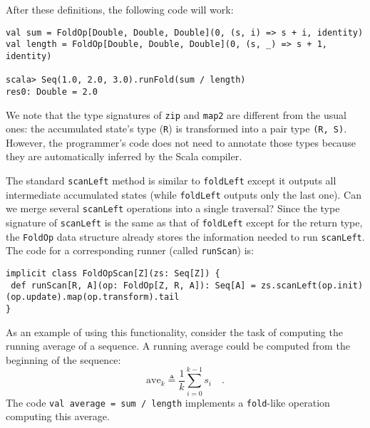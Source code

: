 After these definitions, the following code will work:
\begin{lstlisting}
val sum = FoldOp[Double, Double, Double](0, (s, i) => s + i, identity)
val length = FoldOp[Double, Double, Double](0, (s, _) => s + 1, identity)

scala> Seq(1.0, 2.0, 3.0).runFold(sum / length)
res0: Double = 2.0
\end{lstlisting}

We note that the type signatures of \lstinline!zip! and \lstinline!map2!
are different from the usual ones: the accumulated state\textsf{'}s type (\lstinline!R!)
is transformed into a pair type \lstinline!(R, S)!. However, the
programmer\textsf{'}s code does not need to annotate those types because they
are automatically inferred by the Scala compiler.

The standard \lstinline!scanLeft! method is similar to \lstinline!foldLeft!
except it outputs all intermediate accumulated states (while \lstinline!foldLeft!
outputs only the last one). Can we merge several \lstinline!scanLeft!
operations into a single traversal? Since the type signature of \lstinline!scanLeft!
is the same as that of \lstinline!foldLeft! except for the return
type, the \lstinline!FoldOp! data structure already stores the information
needed to run \lstinline!scanLeft!. The code for a corresponding
runner (called \lstinline!runScan!) is:
\begin{lstlisting}
implicit class FoldOpScan[Z](zs: Seq[Z]) {
 def runScan[R, A](op: FoldOp[Z, R, A]): Seq[A] = zs.scanLeft(op.init)(op.update).map(op.transform).tail
}
\end{lstlisting}

As an example of using this functionality, consider the task of computing
the running average of a sequence. A running average could be computed
from the beginning of the sequence:
\[
\text{ave}_{k}\triangleq\frac{1}{k}\sum_{i=0}^{k-1}s_{i}\quad.
\]
The code \lstinline!val average = sum / length! implements a \lstinline!fold!-like
operation computing this average.

